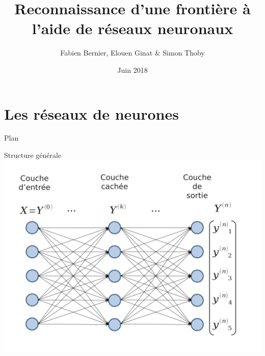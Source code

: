 \documentclass[ignorenonframetext,]{beamer}
\title{Reconnaissance d'une frontière à l'aide de réseaux neuronaux}
\author{Fabien Bernier, Elouen Ginat \& Simon Thoby}
\date{Juin 2018}
\begin{document}
\section{Les réseaux de neurones}
\frame{\titlepage}

\begin{frame}{Plan}
\tableofcontents
\end{frame}

\begin{frame}{Structure générale}
	\includegraphics{net-without-train.png}
\end{frame}

\end{document}
